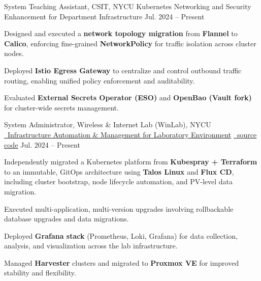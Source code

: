 
\begin{cventries}

  \cventry
    {System Teaching Assistant, CSIT, NYCU} %
    {Kubernetes Networking and Security Enhancement for Department Infrastructure} %
    {} %
    {Jul. 2024 -- Present} %
    {
      \begin{cvitems}
        \item {Designed and executed a \textbf{network topology migration} from \textbf{Flannel} to \textbf{Calico}, enforcing fine-grained \textbf{NetworkPolicy} for traffic isolation across cluster nodes.}
        \item {Deployed \textbf{Istio Egress Gateway} to centralize and control outbound traffic routing, enabling unified policy enforcement and auditability.}
        \item {Evaluated \textbf{External Secrets Operator (ESO)} and \textbf{OpenBao (Vault fork)} for cluster-wide secrets management.}
      \end{cvitems}
    }

  \cventry
    {System Administrator, Wireless \& Internet Lab (WinLab), NYCU} %
    {\href{https://github.com/ChesterChuTw/winfra-cluster-management}
    {\faGithub\ Infrastructure Automation \& Management for Laboratory Environment}}
    {\href{https://github.com/ChesterChuTw/winfra-cluster-management}{\faGithub\ source code}} %
    {Jul. 2024 -- Present} %
    {
      \begin{cvitems}
        \item {Independently migrated a Kubernetes platform from \textbf{Kubespray + Terraform} to an immutable, GitOps architecture using \textbf{Talos Linux} and \textbf{Flux CD}, including cluster bootstrap, node lifecycle automation, and PV-level data migration.}
        \item {Executed multi-application, multi-version upgrades involving rollbackable database upgrades and data migrations.}
        \item {Deployed \textbf{Grafana stack} (Prometheus, Loki, Grafana) for data collection, analysis, and visualization across the lab infrastructure.}
        \item {Managed \textbf{Harvester} clusters and migrated to \textbf{Proxmox VE} for improved stability and flexibility.}
      \end{cvitems}
    }


\end{cventries}
